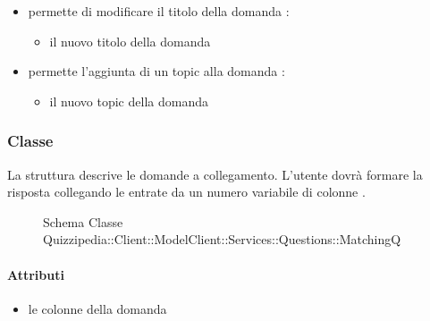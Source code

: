 \begin{itemize}
\begin{itemize}
\end{itemize}
\item {}
\newline
permette di modificare il titolo della domanda
\newline
{} :
\begin{itemize}
\item {}
\newline
il nuovo titolo della domanda
\end{itemize}
\item {}
\newline
permette l'aggiunta di un topic alla domanda
\newline
{} :
\begin{itemize}
\item {}
\newline
il nuovo topic della domanda
\end{itemize}
\end{itemize}
\subsubsection{Classe }
La struttura descrive le domande a collegamento. L'utente dovrà formare la risposta collegando le entrate da un numero variabile di colonne .
\begin{figure}[H]
\centering
\noindent{}
\caption[Schema Classe MatchingQ]{Schema Classe Quizzipedia::Client::ModelClient::Services::Questions::MatchingQ}
\end{figure}
\paragraph{Attributi}
\begin{itemize}
\item {}
\newline
le colonne della domanda
\end{itemize}
